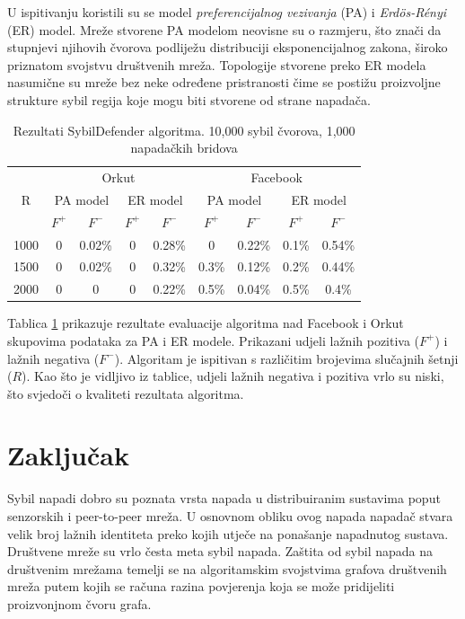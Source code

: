 \documentclass[times, utf8, seminar, numeric]{fer}
\begin{document}
U ispitivanju koristili su se model \textit{preferencijalnog vezivanja}  (PA) i \textit{Erdös-Rényi} (ER) model. Mreže stvorene PA modelom neovisne su o razmjeru, što znači da stupnjevi njihovih čvorova podliježu distribuciji eksponencijalnog zakona, široko priznatom svojstvu društvenih mreža. Topologije stvorene preko ER modela nasumične su mreže bez neke određene pristranosti čime se postižu proizvoljne strukture sybil regija koje mogu biti stvorene od strane napadača.

\begin{table}[!h]
	\centering
  \caption{Rezultati SybilDefender algoritma\cite{sybil-defender}. 10,000 sybil čvorova, 1,000 napadačkih bridova}
	\label{tbl:results}
	
	\begin{tabular}{|c|c|c|c|c|c|c|c|c|} \hline
    \multirow{3}{*}{R} & \multicolumn{4}{c|}{Orkut} & \multicolumn{4}{c|}{Facebook} \\
    & \multicolumn{2}{c}{PA model} & \multicolumn{2}{c|}{ER model} & \multicolumn{2}{c}{PA model} & \multicolumn{2}{c|}{ER model} \\
    & \multicolumn{1}{c}{$F^+$} & \multicolumn{1}{c}{$F^-$} & \multicolumn{1}{c}{$F^+$} & \multicolumn{1}{c|}{$F^-$} & \multicolumn{1}{c}{$F^+$} & \multicolumn{1}{c}{$F^-$} & \multicolumn{1}{c}{$F^+$} & \multicolumn{1}{c|}{$F^-$} \\ \hline
    1000 & 0 & 0.02\% & 0 & 0.28\% & 0 & 0.22\% & 0.1\% & 0.54\% \\
    1500 & 0 & 0.02\% & 0 & 0.32\% & 0.3\% & 0.12\% & 0.2\% & 0.44\% \\
    2000 & 0 & 0 & 0 & 0.22\% & 0.5\% & 0.04\% & 0.5\% & 0.4\% \\
		\hline
	\end{tabular}
\end{table}

Tablica \ref{tbl:results} prikazuje rezultate evaluacije algoritma nad Facebook i Orkut skupovima podataka za PA i ER modele. Prikazani udjeli lažnih pozitiva ($F^+$) i lažnih negativa ($F^-$). Algoritam je ispitivan s različitim brojevima slučajnih šetnji ($R$). Kao što je vidljivo iz tablice, udjeli lažnih negativa i pozitiva vrlo su niski, što svjedoči o kvaliteti rezultata algoritma.

\chapter{Zaključak} \label{ch:conclusion}
Sybil napadi dobro su poznata vrsta napada u distribuiranim sustavima poput senzorskih i peer-to-peer mreža. U osnovnom obliku ovog napada napadač stvara velik broj lažnih identiteta preko kojih utječe na ponašanje napadnutog sustava. Društvene mreže su vrlo česta meta sybil napada. Zaštita od sybil napada na društvenim mrežama temelji se na algoritamskim svojstvima grafova društvenih mreža putem kojih se računa razina povjerenja koja se može pridijeliti proizvonjnom čvoru grafa.
\end{document}
